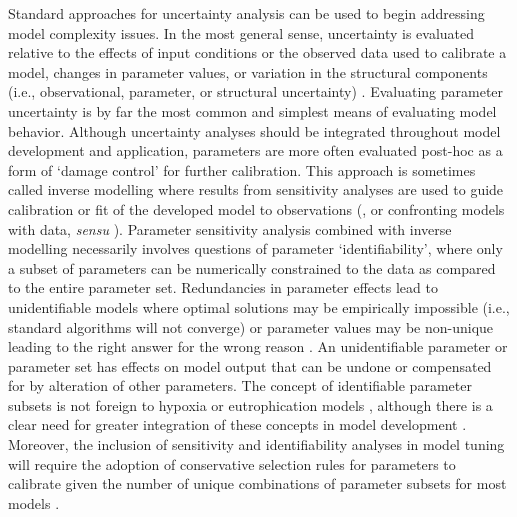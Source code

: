 \documentclass[letterpaper,12pt,oneside]{article}\usepackage[]{graphicx}\usepackage[]{color}
\begin{document}
Standard approaches for uncertainty analysis can be used to begin addressing model complexity issues.  In the most general sense, uncertainty is evaluated relative to the effects of input conditions or the observed data used to calibrate a model, changes in parameter values, or variation in the structural components (i.e., observational, parameter, or structural uncertainty) \citep{Beck87}.  Evaluating parameter uncertainty is by far the most common and simplest means of evaluating model behavior.  Although uncertainty analyses should be integrated throughout model development and application, parameters are more often evaluated post-hoc as a form of `damage control' for further calibration.  This approach is sometimes called inverse modelling where results from sensitivity analyses are used to guide calibration or fit of the developed model to observations (\citealt{Soetaert10}, or confronting models with data, \textit{sensu} \citealt{Hilborn97}).  Parameter sensitivity analysis combined with inverse modelling necessarily involves questions of parameter `identifiability', where only a subset of parameters can be numerically constrained to the data as compared to the entire parameter set.  Redundancies in parameter effects lead to unidentifiable models where optimal solutions may be empirically impossible (i.e., standard algorithms will not converge) or parameter values may be non-unique leading to the right answer for the wrong reason \citep{Kirchner06}. An unidentifiable parameter or parameter set has effects on model output that can be undone or compensated for by alteration of other parameters.  The concept of identifiable parameter subsets is not foreign to hypoxia or eutrophication models  \citep{Omlin01,Estrada10,Mateus15}, although there is a clear need for greater integration of these concepts in model development \citep{Fasham06}.  Moreover, the inclusion of sensitivity and identifiability analyses in model tuning will require the adoption of conservative selection rules for parameters to calibrate given the number of unique combinations of parameter subsets for most models \citep[e.g.,][]{Wagener01, Wagener01b}.  
\end{document}
